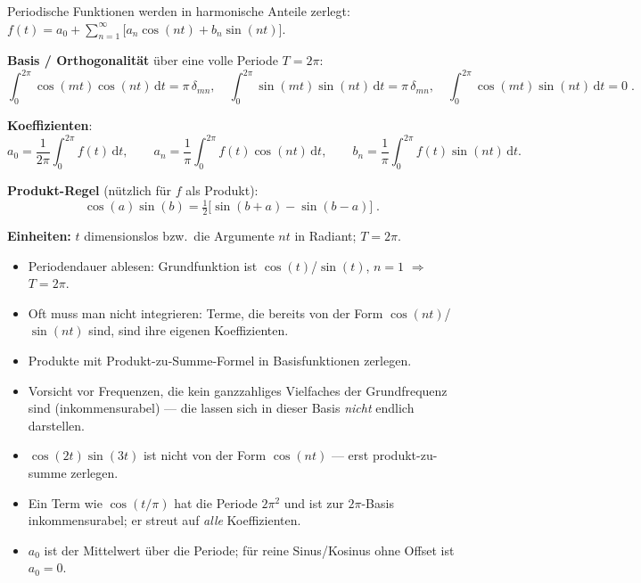 

Periodische Funktionen werden in harmonische Anteile zerlegt:
$f(t)=a_0+\sum_{n=1}^\infty\big[a_n\cos(nt)+b_n\sin(nt)\big]$.

\begin{werkzeugkasten}[Werkzeuge]
\textbf{Basis / Orthogonalität} über eine volle Periode $T=2\pi$:
\begin{equation}
  \int_0^{2\pi}\cos(mt)\cos(nt)\,\mathrm dt
  =\pi\,\delta_{mn},\quad
  \int_0^{2\pi}\sin(mt)\sin(nt)\,\mathrm dt
  =\pi\,\delta_{mn},\quad
  \int_0^{2\pi}\cos(mt)\sin(nt)\,\mathrm dt=0\;.
\end{equation}

\textbf{Koeffizienten}:
\begin{equation}
  a_0=\frac1{2\pi}\int_0^{2\pi}f(t)\,\mathrm dt,\qquad
  a_n=\frac1\pi\int_0^{2\pi}f(t)\cos(nt)\,\mathrm dt,\qquad
  b_n=\frac1\pi\int_0^{2\pi}f(t)\sin(nt)\,\mathrm dt .
\end{equation}

\textbf{Produkt-Regel} (nützlich für $f$ als Produkt):
\begin{equation}
  \cos(a)\sin(b)=\tfrac12\big[\sin(b+a)-\sin(b-a)\big]\;.
\end{equation}

\textbf{Einheiten:} $t$ dimensionslos bzw.\ die Argumente $nt$ in Radiant;
$T=2\pi$.
\end{werkzeugkasten}

\begin{werkzeugkasten}[Vorgehen]
\begin{itemize}
  \item Periodendauer ablesen: Grundfunktion ist $\cos(t)$/$\sin(t)$,
       $n=1$ $\Rightarrow$ $T=2\pi$.
  \item Oft muss man nicht integrieren: Terme, die bereits von der Form
       $\cos(nt)$/$\sin(nt)$ sind, sind ihre eigenen Koeffizienten.
  \item Produkte mit Produkt-zu-Summe-Formel in Basisfunktionen zerlegen.
  \item Vorsicht vor Frequenzen, die kein ganzzahliges Vielfaches der
       Grundfrequenz sind (inkommensurabel) --- die lassen sich in dieser
       Basis \emph{nicht} endlich darstellen.
\end{itemize}
\end{werkzeugkasten}

\begin{achtung}
\begin{itemize}
  \item $\cos(2t)\sin(3t)$ ist nicht von der Form $\cos(nt)$ --- erst
       produkt-zu-summe zerlegen.
  \item Ein Term wie $\cos(t/\pi)$ hat die Periode $2\pi^2$ und ist zur
       $2\pi$-Basis inkommensurabel; er streut auf \emph{alle} Koeffizienten.
  \item $a_0$ ist der Mittelwert über die Periode; für reine Sinus/Kosinus
       ohne Offset ist $a_0=0$.
\end{itemize}
\end{achtung}
